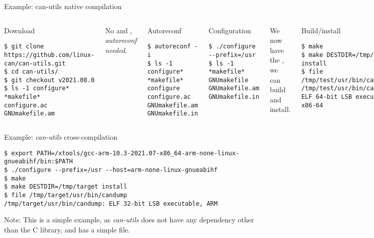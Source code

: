 \begin{frame}[fragile]{Example: can-utils native compilation}
  \begin{columns}
  \begin{block}{Download}
    {\tiny
\begin{verbatim}
$ git clone https://github.com/linux-can/can-utils.git
$ cd can-utils/
$ git checkout v2021.08.0
$ ls -1 configure* *makefile*
configure.ac
GNUmakefile.am
\end{verbatim}
    }
  \end{block}

  {\small No  and
    , {\em autoreconf needed}.}

  \begin{block}{Autoreconf}
    {\tiny
\begin{verbatim}
$ autoreconf -i
$ ls -1 configure* *makefile*
configure
configure.ac
GNUmakefile.am
GNUmakefile.in
\end{verbatim}
    }
  \end{block}


  \begin{block}{Configuration}
    {\tiny
\begin{verbatim}
$ ./configure --prefix=/usr
$ ls -1 *makefile*
GNUmakefile
GNUmakefile.am
GNUmakefile.in
\end{verbatim}
    }
  \end{block}

  {\small We now have the , we can build and install.}

  \begin{block}{Build/install}
    {\tiny
\begin{verbatim}
$ make
$ make DESTDIR=/tmp/test install
$ file /tmp/test/usr/bin/candump
/tmp/test/usr/bin/candump: ELF 64-bit LSB executable, x86-64
\end{verbatim}
    }
  \end{block}

\end{columns}
\end{frame}

\begin{frame}[fragile]{Example: {\em can-utils} cross-compilation}
  \begin{block}{}
    {\tiny
\begin{verbatim}
$ export PATH=/xtools/gcc-arm-10.3-2021.07-x86_64-arm-none-linux-gnueabihf/bin:$PATH
$ ./configure --prefix=/usr --host=arm-none-linux-gnueabihf
$ make
$ make DESTDIR=/tmp/target install
$ file /tmp/target/usr/bin/candump
/tmp/target/usr/bin/candump: ELF 32-bit LSB executable, ARM
\end{verbatim}
    }
    \end{block}

    Note: This is a simple example, as {\em can-utils} does not have
    any dependency other than the C library, and has a simple
     file.
\end{frame}

